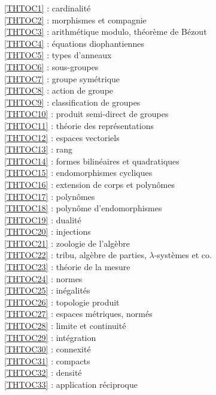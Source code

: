 \ref {THTOC1} : cardinalité\\
\ref {THTOC2} : morphismes et compagnie\\
\ref {THTOC3} : arithmétique modulo, théorème de Bézout\\
\ref {THTOC4} : équations diophantiennes\\
\ref {THTOC5} : types d'anneaux\\
\ref {THTOC6} : sous-groupes\\
\ref {THTOC7} : groupe symétrique\\
\ref {THTOC8} : action de groupe\\
\ref {THTOC9} : classification de groupes\\
\ref {THTOC10} : produit semi-direct de groupes\\
\ref {THTOC11} : théorie des représentations\\
\ref {THTOC12} : espaces vectoriels\\
\ref {THTOC13} : rang\\
\ref {THTOC14} : formes bilinéaires et quadratiques\\
\ref {THTOC15} : endomorphismes cycliques\\
\ref {THTOC16} : extension de corps et polynômes\\
\ref {THTOC17} : polynômes\\
\ref {THTOC18} : polynôme d'endomorphismes\\
\ref {THTOC19} : dualité\\
\ref {THTOC20} : injections\\
\ref {THTOC21} : zoologie de l'algèbre\\
\ref {THTOC22} : tribu, algèbre de parties, \( \lambda \)-systèmes et co.\\
\ref {THTOC23} : théorie de la mesure\\
\ref {THTOC24} : normes\\
\ref {THTOC25} : inégalités\\
\ref {THTOC26} : topologie produit\\
\ref {THTOC27} : espaces métriques, normés\\
\ref {THTOC28} : limite et continuité\\
\ref {THTOC29} : intégration\\
\ref {THTOC30} : connexité\\
\ref {THTOC31} : compacts\\
\ref {THTOC32} : densité\\
\ref {THTOC33} : application réciproque\\
